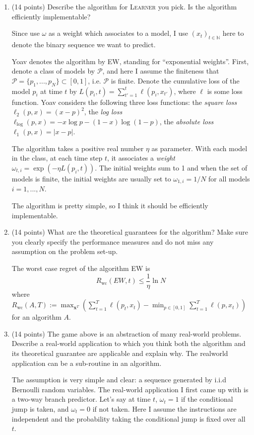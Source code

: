 \documentclass[a4paper, 12pt]{article}
\newcommand{\N}{\mathbb{N}}
\begin{document}
\begin{enumerate}
    \item (14 points) Describe the algorithm for \textsc{Learner} you pick. Is the algorithm efficiently implementable?
    \par {\color{blue} Since \cite{freund2003predicting} use $\omega$ as a weight which associates to a model, I use $(x_t)_{t\in\N}$ here to denote the binary sequence we want to predict.
    \par Yoav denotes the algorithm by EW, standing for ``exponential weights''. First, denote a class of models by $\mathcal{P}$, and here I assume the finiteness that $\mathcal{P} = \{p_1, ..., p_N\} \subset [0, 1]$, i.e. $\mathcal{P}$ is finite. Denote the cumulative loss of the model $p_i$ at time $t$ by $L(p_i, t) = \sum_{t'=1}^t \ell(p_i, x_{t'})$, where $\ell$ is some loss function. Yoav considers the following three loss functions: the \textit{square loss} $\ell_2(p, x) = (x - p)^2$, the \textit{log loss} $\ell_{\log}(p, x) = -x \log p -(1-x) \log (1-p)$, the \textit{absolute loss} $\ell_1(p, x) = |x - p|$.
    \par The algorithm takes a positive real number $\eta$ as parameter. With each model in the class, at each time step $t$, it associates a \textit{weight} $\omega_{t,i}=\exp(-\eta L(p_i, t))$. The initial weights sum to 1 and when the set of models is finite, the initial weights are usually set to $\omega_{1, i}=1/N$ for all models $i=1, ..., N$.
    \par The algorithm is pretty simple, so I think it should be efficiently implementable.
    }
    \item (14 points) What are the theoretical guarantees for the algorithm? Make sure you clearly specify the performance measures and do not miss any assumption on the problem set-up.
    \par {\color{blue} The worst case regret of the algorithm EW is
    \[R_{\text{wc}}(EW, t) \leq \frac{1}{\eta}\ln N\]
    where $\displaystyle R_{\text{wc}}(A, T) := \max_{\mathbf{x}^T}\left(\sum_{t=1}^T \ell(p_t, x_t) - \min_{p\in[0,1]}\sum_{t=1}^T\ell(p, x_t)\right)$ for an algorithm $A$.
    }
    \item (14 points) The game above is an abstraction of many real-world problems. Describe a real-world application
    to which you think both the algorithm and its theoretical guarantee are applicable and explain why. The realworld application can be a sub-routine in an algorithm.
    \par {\color{blue} The assumption is very simple and clear: a sequence generated by i.i.d Bernoulli random variables. The real-world application I first came up with is a two-way branch predictor. Let's say at time $t$, $\omega_t = 1$ if the conditional jump is taken, and $\omega_t=0$ if not taken. Here I assume the instructions are independent and the probability taking the conditional jump is fixed over all $t$.}


\end{enumerate}
\end{document}
